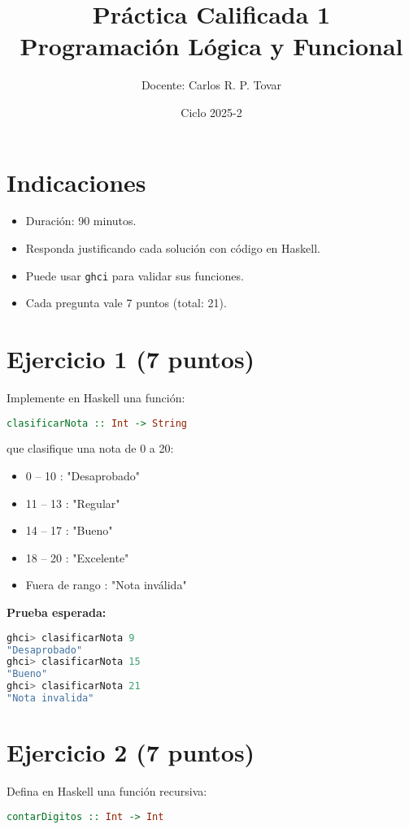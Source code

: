 \documentclass[12pt]{article}
\title{\textbf{Práctica Calificada 1} \\ Programación Lógica y Funcional}
\author{Docente: Carlos R. P. Tovar}
\date{Ciclo 2025-2}
\begin{document}
\maketitle

\section*{Indicaciones}
\begin{itemize}
    \item Duración: 90 minutos.
    \item Responda justificando cada solución con código en Haskell.
    \item Puede usar \texttt{ghci} para validar sus funciones.
    \item Cada pregunta vale 7 puntos (total: 21).
\end{itemize}

\section*{Ejercicio 1 (7 puntos)}
Implemente en Haskell una función:

\begin{lstlisting}[language=Haskell]
clasificarNota :: Int -> String
\end{lstlisting}

que clasifique una nota de 0 a 20:
\begin{itemize}
    \item 0 -- 10 : "Desaprobado"
    \item 11 -- 13 : "Regular"
    \item 14 -- 17 : "Bueno"
    \item 18 -- 20 : "Excelente"
    \item Fuera de rango : "Nota inválida"
\end{itemize}

\textbf{Prueba esperada:}
\begin{lstlisting}[language=Haskell]
ghci> clasificarNota 9
"Desaprobado"
ghci> clasificarNota 15
"Bueno"
ghci> clasificarNota 21
"Nota invalida"
\end{lstlisting}

\section*{Ejercicio 2 (7 puntos)}
Defina en Haskell una función recursiva:

\begin{lstlisting}[language=Haskell]
contarDigitos :: Int -> Int
\end{lstlisting}
\end{document}
